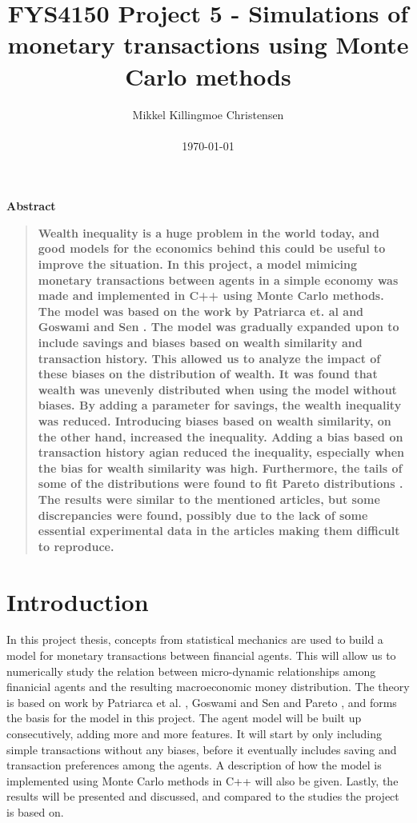 \documentclass[11pt,a4paper,titlepage]{article}
\title{FYS4150 Project 5 - Simulations of monetary transactions using Monte Carlo methods}
\author
{Mikkel Killingmoe Christensen\\
\\
\normalsize{\today}
}
\date{}
\newenvironment{sciabstract}{%
\begin{quote} \bf}
{\end{quote}}
\begin{document}
 


\maketitle 


\tableofcontents
\clearpage


\begin{center}
{\large \textbf{Abstract}}
\end{center}
\begin{sciabstract}
Wealth inequality is a huge problem in the world today, and good models  for the economics behind this could be useful to improve the situation. In this project, a model mimicing monetary transactions between agents in a simple economy was made and implemented in C++ using Monte Carlo methods. The model was based on the work by Patriarca et. al \cite{Patriarca} and Goswami and Sen \cite{Goswami}. The model was gradually expanded upon to include savings and biases based on wealth similarity and transaction history. This allowed us to analyze the impact of these biases on the distribution of wealth. It was found that wealth was unevenly distributed when using the model without biases. By adding a parameter for savings, the wealth inequality was reduced. Introducing biases based on wealth similarity, on the other hand, increased the inequality.  Adding a bias based on transaction history agian reduced the inequality, especially when the bias for wealth similarity was high. Furthermore, the tails of some of the distributions were found to fit Pareto distributions \cite{Pareto}. The results were similar to the mentioned articles, but some discrepancies were found, possibly due to the lack of some essential experimental data in the articles making them difficult to reproduce.  
\end{sciabstract}




\section{Introduction}
In this project thesis, concepts from statistical mechanics are used to build a model for monetary transactions between financial agents. This will allow us to numerically study the relation between micro-dynamic relationships among finanicial agents and the resulting macroeconomic money distribution. The theory is based on work by Patriarca et al. \cite{Patriarca}, Goswami and Sen \cite{Goswami} and Pareto \cite{Pareto}, and forms the basis for the model in this project. The agent model will be built up consecutively, adding more and more features. It will start by only including simple transactions without any biases, before it eventually includes saving and transaction preferences among the agents. A description of how the model is implemented using Monte Carlo methods in C++ will also be given. Lastly, the results will be presented and discussed, and compared to the studies the project is based on. 
\end{document}
